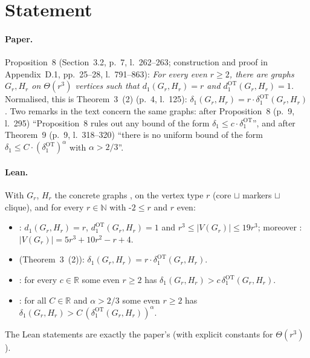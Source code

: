 

\paperversion

\section{Statement}

\paragraph{Paper.} Proposition~8 (Section~3.2, p.~7, l.~262--263; construction and proof in Appendix~D.1,
pp.~25--28, l.~791--863): \emph{For every even $r\ge2$, there are graphs $G_r,H_r$ on $\Theta(r^3)$ vertices
such that $d_1(G_r,H_r)=r$ and $d^{\mathrm{OT}}_1(G_r,H_r)=1$.} Normalised, this is Theorem~3~(2) (p.~4,
l.~125): $\delta_1(G_r,H_r)=r\cdot\delta_1^{\mathrm{OT}}(G_r,H_r)$. Two remarks in the text concern the same
graphs: after Proposition~8 (p.~9, l.~295) ``Proposition~8 rules out any bound of the form
$\delta_1\le c\cdot\delta_1^{\mathrm{OT}}$'', and after Theorem~9 (p.~9, l.~318--320) ``there is no uniform
bound of the form $\delta_1\le C\cdot(\delta_1^{\mathrm{OT}})^\alpha$ with $\alpha>2/3$''.

\paragraph{Lean.} With $G_r$, $H_r$ the concrete graphs ,  on the
vertex type  $r$ (core $\sqcup$ markers $\sqcup$ clique), and for every $r\in\mathbb N$ with
\hyp{$2\le r$ and $r$ even}:
\begin{itemize}
\item {}: $d_1(G_r,H_r)=r$, $d_1^{\mathrm{OT}}(G_r,H_r)=1$ and
  $r^3\le|V(G_r)|\le19r^3$; moreover : $|V(G_r)|=5r^3+10r^2-r+4$.
\item {} (Theorem~3~(2)): $\delta_1(G_r,H_r)=r\cdot\delta_1^{\mathrm{OT}}(G_r,H_r)$.
\item {}: for every $c\in\mathbb R$ some even $r\ge2$ has
  $\delta_1(G_r,H_r)>c\,\delta_1^{\mathrm{OT}}(G_r,H_r)$.
\item {}: for all $C\in\mathbb R$ and $\alpha>2/3$ some even $r\ge2$ has
  $\delta_1(G_r,H_r)>C\,(\delta_1^{\mathrm{OT}}(G_r,H_r))^\alpha$.
\end{itemize}
The Lean statements are exactly the paper's (with explicit constants for $\Theta(r^3)$).

